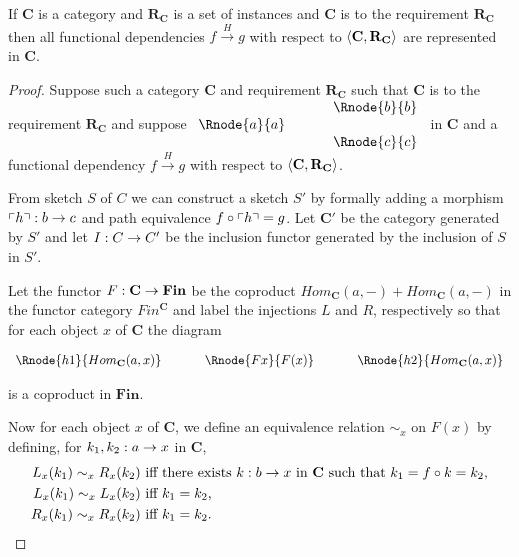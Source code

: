 \documentclass[10pt,a4paper]{article}
\theoremstyle{remark}
\newcommand{\catc}[1][C]{\textbf{#1}}
\newcommand{\catcp}[1][C]{\textbf{#1}'}
\newcommand{\reqt}{\textbf{R}}
\newcommand{\reqtc}[1][\catc]{\reqt_{#1}}
\newcommand{\Fin}{\ensuremath{\textbf{Fin}} }
\newcommand{\fundep}[3]{#2 \xrightarrow{#1} #3}
\begin{document}
\begin{lemma}
If $\catc$ is a  category and $\reqtc$ is a set of instances  and $\catc$ is 
 to the requirement $\reqtc$ then
all functional dependencies $\fundep{H}{f}{g}$  with respect to $\tuple{\catc,\reqtc}$ are represented in $\catc$.
\end{lemma}
\begin{proof}
Suppose such a category  $\catc$  and requirement $\reqtc$ such that 
$\catc$ is 
 to the requirement $\reqtc$ and suppose
$
\begin{array}{c p{0.5cm} c  }
             &&   \Rnode{b}{b} \\[0.01cm]
\Rnode{a}{a} &&                \\[0.01cm] 
             &&   \Rnode{c}{c}         
\end{array} 
$
in $\catc$ 
and  a functional dependency $\fundep{H}{f}{g}$ with respect to $\tuple{\catc,\reqtc}$.

From sketch $S$ of $C$ we can construct a sketch $S'$ by formally adding a morphism $\left\ulcorner h\right\urcorner: b \rightarrow c$
and path equivalence $f \circ \left\ulcorner h\right\urcorner = g$. Let $\catcp$ be the category generated by $S'$ and
let $I: C \rightarrow C'$ be the inclusion functor generated by the inclusion of $S$ in $S'$. 

Let the functor $F: \catc \morph \Fin$ be the coproduct $Hom_{\catc}(a,-) + Hom_{\catc}(a,-)$
in the functor category $Fin^{\catc}$ and label the injections $L$ and $R$, respectively so that
for each object $x$ of $\catc$ the diagram
\begin{center}
$
\begin{array}{c p{0.5cm} c p{0.5cm} c  }
\Rnode{h1}{Hom_{\catc}(a,x)}  &&\Rnode{Fx}{F(x)}  &&   \Rnode{h2}{Hom_{\catc}(a,x)}       
\end{array} 
$
\end{center}
is a coproduct in $\Fin$.

Now for each object $x$ of $\catc$, we define an equivalence relation $\sim_x$ on $F(x)$ by defining,
for $k_1,k_2:a \rightarrow x$ in $\catc$,
\begin{align*}
L_x(k_1) \sim_x R_x(k_2) & \mbox{ iff there exists $k:b \morph x$ in $\catc$ such that $k_1 = f \circ k = k_2$,}\\
L_x(k_1) \sim_x L_x(k_2) & \mbox{ iff $k_1 = k_2$,} \\
R_x(k_1) \sim_x R_x(k_2) & \mbox{ iff $k_1 = k_2$.} \\
\end{align*}


\end{proof}
\end{document}
